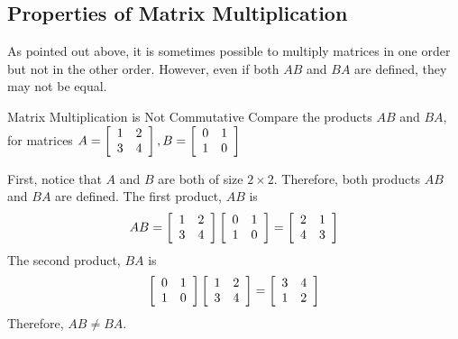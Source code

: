 \subsection{Properties of Matrix Multiplication}

As pointed out above, it is sometimes possible
to multiply matrices in one order
but not in the other order. However, even if both $AB$ and $BA$ are defined,
they may not be equal. 

\begin{example}{Matrix Multiplication is Not Commutative}\label{exa:noncommutativemultiplication}
Compare the products $AB$ and $BA$, for matrices $ A = \left[
\begin{array}{rr}
1 & 2 \\
3 & 4
\end{array}
\right], B= \left[
\begin{array}{rr}
0 & 1 \\
1 & 0
\end{array}
\right] $ 
\end{example}

\begin{solution} 
First, notice that $A$ and $B$ are both of size $2 \times 2$. Therefore, both 
products $AB$ and $BA$ are defined. 
The first product, $AB$ is
\begin{equation*}
AB = \left[
\begin{array}{rr}
1 & 2 \\
3 & 4
\end{array}
\right] \left[
\begin{array}{rr}
0 & 1 \\
1 & 0
\end{array}
\right] = \left[
\begin{array}{rr}
2 & 1 \\
4 & 3
\end{array}
\right] 
\end{equation*}
The second product, $BA$ is
\begin{equation*}
\left[
\begin{array}{rr}
0 & 1 \\
1 & 0
\end{array}
\right] \left[
\begin{array}{rr}
1 & 2 \\
3 & 4
\end{array}
\right] = \left[
\begin{array}{rr}
3 & 4 \\
1 & 2
\end{array}
\right] 
\end{equation*}
Therefore, $AB \neq BA$. 
\end{solution}

